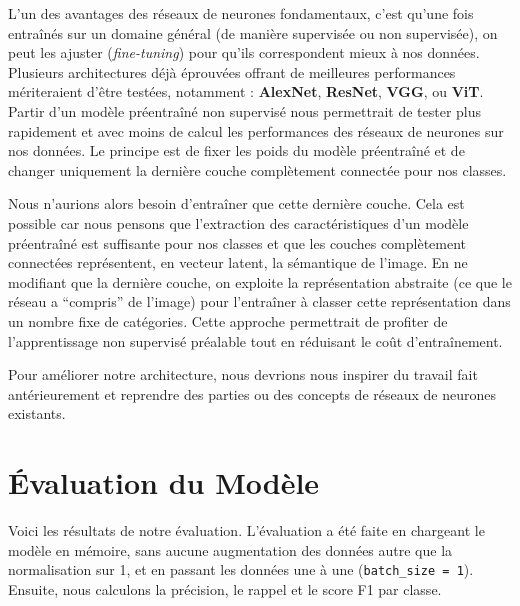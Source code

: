 \documentclass{article}
\begin{document}
L’un des avantages des réseaux de neurones fondamentaux, c’est qu’une fois entraînés sur un domaine général (de manière supervisée ou non supervisée), on peut les ajuster (\emph{fine-tuning}) pour qu’ils correspondent mieux à nos données. Plusieurs architectures déjà éprouvées offrant de meilleures performances mériteraient d’être testées, notamment : \textbf{AlexNet}, \textbf{ResNet}, \textbf{VGG}, ou \textbf{ViT}. Partir d’un modèle préentraîné non supervisé nous permettrait de tester plus rapidement et avec moins de calcul les performances des réseaux de neurones sur nos données. Le principe est de fixer les poids du modèle préentraîné et de changer uniquement la dernière couche complètement connectée pour nos classes.

Nous n’aurions alors besoin d’entraîner que cette dernière couche. Cela est possible car nous pensons que l’extraction des caractéristiques d’un modèle préentraîné est suffisante pour nos classes et que les couches complètement connectées représentent, en vecteur latent, la sémantique de l’image. En ne modifiant que la dernière couche, on exploite la représentation abstraite (ce que le réseau a ``compris'' de l’image) pour l’entraîner à classer cette représentation dans un nombre fixe de catégories. Cette approche permettrait de profiter de l’apprentissage non supervisé préalable tout en réduisant le coût d’entraînement.

Pour améliorer notre architecture, nous devrions nous inspirer du travail fait antérieurement et reprendre des parties ou des concepts de réseaux de neurones existants.

\section{ Évaluation du Modèle}

Voici les résultats de notre évaluation. L’évaluation a été faite en chargeant le modèle en mémoire, sans aucune augmentation des données autre que la normalisation sur 1, et en passant les données une à une (\texttt{batch\_size = 1}). Ensuite, nous calculons la précision, le rappel et le score F1 par classe.
\end{document}
